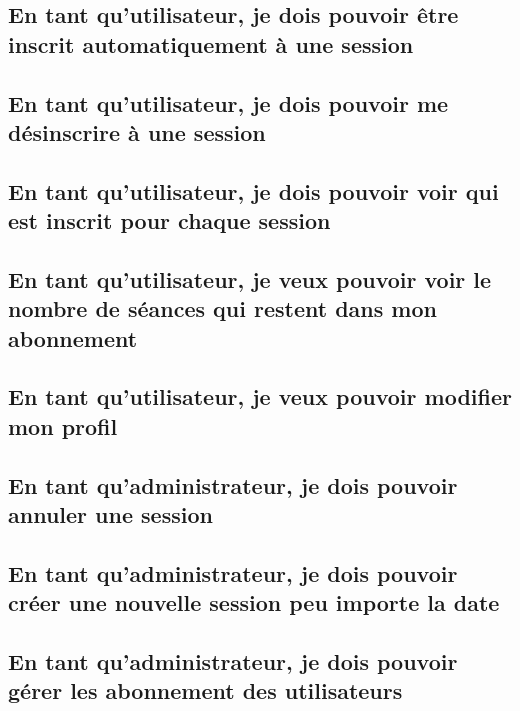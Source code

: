 	\subsection{En tant qu’utilisateur, je dois pouvoir être inscrit automatiquement à une session}
		
	
	\newpage
	\subsection{En tant qu’utilisateur, je dois pouvoir me désinscrire à une session}
		

	\newpage
	\subsection{En tant qu’utilisateur, je dois pouvoir voir qui est inscrit pour chaque session}
		
	
	\newpage
	\subsection{En tant qu’utilisateur, je veux pouvoir voir le nombre de séances qui restent dans mon abonnement}
		

	\newpage
	\subsection{En tant qu'utilisateur, je veux pouvoir modifier mon profil}
		

	\newpage
	\subsection{En tant qu’administrateur, je dois pouvoir annuler une session}
		

	\vspace{\baselineskip}
	\subsection{En tant qu'administrateur, je dois pouvoir créer une nouvelle session peu importe la date}
		

	\vspace{\baselineskip}
	\vspace{\baselineskip}
	\subsection{En tant qu'administrateur, je dois pouvoir gérer les abonnement des utilisateurs}
		
